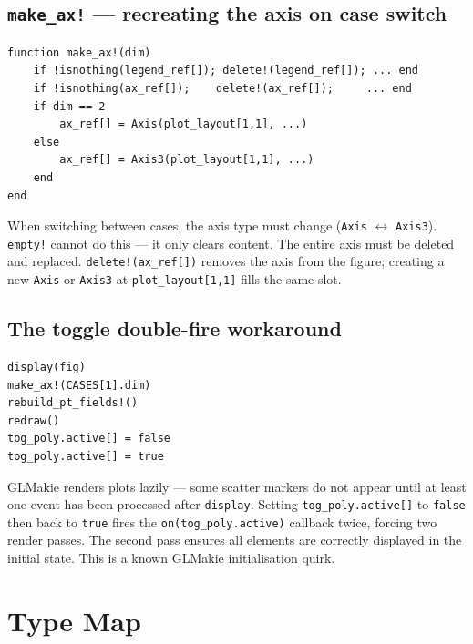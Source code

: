 \documentclass[12pt, a4paper]{article}
\newcommand{\cd}[1]{\texttt{#1}}
\begin{document}
\subsection{\texttt{make\_ax!} --- recreating the axis on case switch}

\begin{verbatim}
function make_ax!(dim)
    if !isnothing(legend_ref[]); delete!(legend_ref[]); ... end
    if !isnothing(ax_ref[]);    delete!(ax_ref[]);     ... end
    if dim == 2
        ax_ref[] = Axis(plot_layout[1,1], ...)
    else
        ax_ref[] = Axis3(plot_layout[1,1], ...)
    end
end
\end{verbatim}

When switching between cases, the axis type must change
(\cd{Axis} $\leftrightarrow$ \cd{Axis3}).
\cd{empty!} cannot do this --- it only clears content.
The entire axis must be deleted and replaced.
\cd{delete!(ax\_ref[])} removes the axis from the figure;
creating a new \cd{Axis} or \cd{Axis3} at
\cd{plot\_layout[1,1]} fills the same slot.

\subsection{The toggle double-fire workaround}

\begin{verbatim}
display(fig)
make_ax!(CASES[1].dim)
rebuild_pt_fields!()
redraw()
tog_poly.active[] = false
tog_poly.active[] = true
\end{verbatim}

GLMakie renders plots lazily --- some scatter markers
do not appear until at least one event has been processed
after \cd{display}.
Setting \cd{tog\_poly.active[]} to \cd{false} then
back to \cd{true} fires the \cd{on(tog\_poly.active)}
callback twice, forcing two render passes.
The second pass ensures all elements are correctly
displayed in the initial state.
This is a known GLMakie initialisation quirk.


\section{Type Map}

\end{document}
